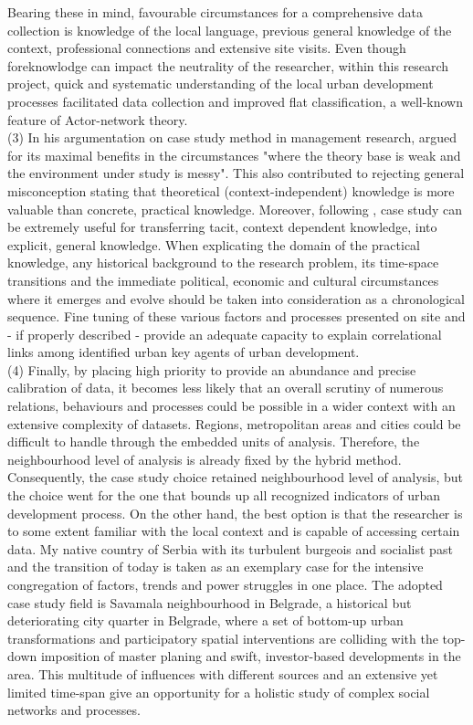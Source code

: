 \documentclass[11pt]{report}
\begin{document}
Bearing these in mind, favourable circumstances for a comprehensive data collection is knowledge of the local language, previous general knowledge of the context, professional connections and extensive site visits. Even though foreknowlodge can impact the neutrality of the researcher, within this research project, quick and systematic understanding of the local urban development processes facilitated data collection and improved flat classification, a well-known feature of Actor-network theory. 
\\
(3) In his argumentation on case study method in management research, \cite{Harrison (2002)} argued for its maximal benefits in the circumstances "where the theory base is weak and the environment under study is messy". This also contributed to rejecting general misconception stating that theoretical (context-independent) knowledge is more valuable than concrete, practical knowledge. Moreover, following \cite{Flyvbjerg (2006)}, case study can be extremely useful for transferring tacit, context dependent knowledge, into explicit, general knowledge. When explicating the domain of the practical knowledge, any historical background to the research problem, its time-space transitions and the immediate political, economic and cultural circumstances where it emerges and evolve should be taken into consideration as a chronological sequence. Fine tuning of these various factors and processes presented on site and  - if properly described - provide an adequate capacity to explain correlational links among identified urban key agents of urban development.
\\
(4) Finally, by placing high priority to provide an abundance and precise calibration of data, it becomes less likely that an overall scrutiny of numerous relations, behaviours and processes could be possible in a wider context with an extensive complexity of datasets. Regions, metropolitan areas and cities could be difficult to handle through the embedded units of analysis. Therefore, the neighbourhood level of analysis is already fixed by the hybrid method.
\\
Consequently, the case study choice retained neighbourhood level of analysis, but the choice went for the one that bounds up all recognized indicators of urban development process. On the other hand, the best option is that the  researcher  is  to  some  extent  familiar  with  the  local  context and  is capable of accessing certain data. 
My native country of Serbia with its turbulent burgeois and socialist past and the transition of today is taken as an exemplary case for the intensive congregation of factors, trends and power struggles in one place. The adopted case study field is Savamala neighbourhood in Belgrade, a historical but deteriorating city quarter in Belgrade, where a set of bottom-up urban transformations and participatory spatial interventions are colliding with the top-down imposition of master planing and swift, investor-based developments in the area. This multitude of influences with different sources and an extensive yet limited time-span give an opportunity for a holistic study of complex social networks and processes. 
\end{document}
